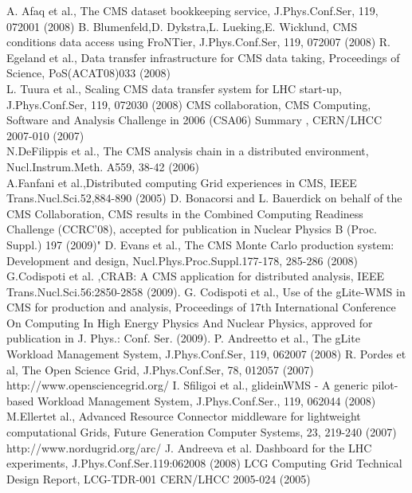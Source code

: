 \begin{thebibliography}{}
%
A. Afaq et al., The CMS dataset bookkeeping service, J.Phys.Conf.Ser, 119, 072001 (2008)
%
B. Blumenfeld,D. Dykstra,L. Lueking,E. Wicklund, CMS conditions data access using FroNTier, J.Phys.Conf.Ser, 119, 072007 (2008)
%
R. Egeland et al., Data transfer infrastructure for CMS data taking, Proceedings of Science, PoS(ACAT08)033 (2008)\\
L. Tuura et al., Scaling CMS data transfer system for LHC start-up, J.Phys.Conf.Ser, 119, 072030 (2008)
%
CMS collaboration,  CMS Computing, Software and Analysis Challenge in 2006 (CSA06) Summary , %
CERN/LHCC 2007-010 (2007) \\
N.DeFilippis et al., The CMS analysis chain in a distributed environment, Nucl.Instrum.Meth. A559, 38-42 (2006) \\
A.Fanfani et al.,Distributed computing Grid experiences in CMS, IEEE Trans.Nucl.Sci.52,884-890 (2005)
%
D. Bonacorsi and L. Bauerdick on behalf of the CMS Collaboration, CMS results in the Combined Computing Readiness Challenge (CCRC’08), accepted for publication in Nuclear Physics B (Proc. Suppl.) 197 (2009)"
D. Evans et al., The CMS Monte Carlo production system: Development and design, Nucl.Phys.Proc.Suppl.177-178, 285-286 (2008)
%
G.Codispoti et al. ,CRAB: A CMS application for distributed analysis, IEEE Trans.Nucl.Sci.56:2850-2858 (2009). 
%
G. Codispoti et al., Use of the gLite-WMS in CMS for production and analysis, Proceedings of 17th International Conference On Computing In High Energy Physics And Nuclear Physics, approved for publication in J. Phys.: Conf. Ser. (2009). 
%
P. Andreetto et al., The gLite Workload Management System, J.Phys.Conf.Ser, 119, 062007 (2008)
%
 R. Pordes et al, The Open Science Grid, J.Phys.Conf.Ser, 78, 012057 (2007) \\
http://www.opensciencegrid.org/
%
 I. Sfiligoi et al., glideinWMS - A generic pilot-based Workload Management System, J.Phys.Conf.Ser., 119, 062044 (2008)
%
 M.Ellertet al., Advanced Resource Connector middleware
  for lightweight computational Grids, Future Generation Computer Systems, 23, 219-240 (2007)\\
http://www.nordugrid.org/arc/
%
J. Andreeva et al. Dashboard for the LHC experiments, J.Phys.Conf.Ser.119:062008 (2008)
%
LCG Computing Grid Technical Design Report, LCG-TDR-001 CERN/LHCC 2005-024 (2005) \\

\end{thebibliography}
